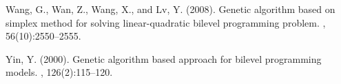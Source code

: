 \documentclass[twoside]{article}
\begin{document}
\begin{thebibliography}{}
Wang, G., Wan, Z., Wang, X., and Lv, Y. (2008).
\newblock Genetic algorithm based on simplex method for solving
  linear-quadratic bilevel programming problem.
, 56(10):2550--2555.

Yin, Y. (2000).
\newblock Genetic algorithm based approach for bilevel programming models.
, 126(2):115--120.

\end{thebibliography}
 
\end{document}
